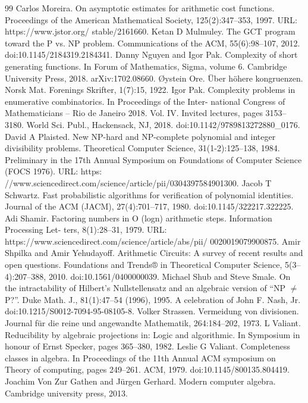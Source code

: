 \documentclass[10pt,a4paper]{article}
\begin{document}
\begin{thebibliography}{99}
 Carlos Moreira. On asymptotic estimates for arithmetic cost functions. Proceedings of the American Mathematical Society, 125(2):347–353, 1997. URL: https://www.jstor.org/ stable/2161660.
 Ketan D Mulmuley. The GCT program toward the P vs. NP problem. Communications of the ACM, 55(6):98–107, 2012. doi:10.1145/2184319.2184341.
 Danny Nguyen and Igor Pak. Complexity of short generating functions. In Forum of Mathematics, Sigma, volume 6. Cambridge University Press, 2018. arXiv:1702.08660.
 Øystein Ore. Über höhere kongruenzen. Norsk Mat. Forenings Skrifter, 1(7):15, 1922.
 Igor Pak. Complexity problems in enumerative combinatorics. In Proceedings of the Inter- national Congress of Mathematicians – Rio de Janeiro 2018. Vol. IV. Invited lectures, pages 3153–3180. World Sci. Publ., Hackensack, NJ, 2018. doi:10.1142/9789813272880\_0176.
 David A Plaisted. New NP-hard and NP-complete polynomial and integer divisibility problems. Theoretical Computer Science, 31(1-2):125–138, 1984. Preliminary in the 17th Annual Symposium on Foundations of Computer Science (FOCS 1976). URL: https: //www.sciencedirect.com/science/article/pii/0304397584901300.
 Jacob T Schwartz. Fast probabilistic algorithms for verification of polynomial identities. Journal of the ACM (JACM), 27(4):701–717, 1980. doi:10.1145/322217.322225.
 Adi Shamir. Factoring numbers in O (logn) arithmetic steps. Information Processing Let- ters, 8(1):28–31, 1979. URL: https://www.sciencedirect.com/science/article/abs/pii/ 0020019079900875.
 Amir Shpilka and Amir Yehudayoff. Arithmetic Circuits: A survey of recent results and open questions. Foundations and Trends® in Theoretical Computer Science, 5(3–4):207–388, 2010. doi:10.1561/0400000039.
 Michael Shub and Steve Smale. On the intractability of Hilbert’s Nullstellensatz and an algebraic version of “NP $\neq$ P?”. Duke Math. J., 81(1):47–54 (1996), 1995. A celebration of John F. Nash, Jr. doi:10.1215/S0012-7094-95-08105-8.
 Volker Strassen. Vermeidung von divisionen. Journal für die reine und angewandte Mathematik, 264:184–202, 1973.
 L Valiant. Reducibility by algebraic projections in: Logic and algorithmic. In Symposium in honour of Ernst Specker, pages 365–380, 1982.
 Leslie G Valiant. Completeness classes in algebra. In Proceedings of the 11th Annual ACM symposium on Theory of computing, pages 249–261. ACM, 1979. doi:10.1145/800135.804419.
 Joachim Von Zur Gathen and Jürgen Gerhard. Modern computer algebra. Cambridge university press, 2013.

\end{thebibliography}
\end{document}
